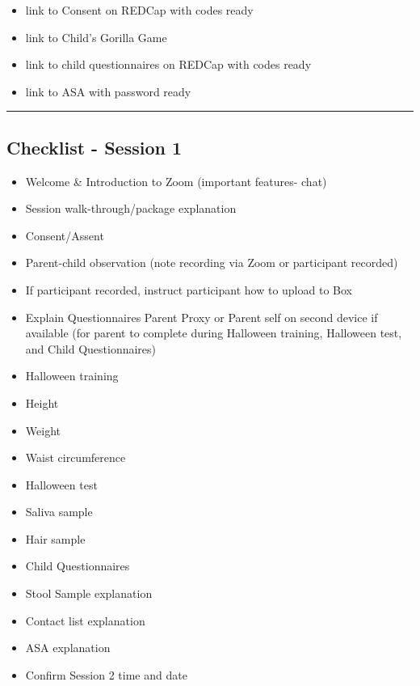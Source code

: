 \documentclass[]{book}
\providecommand{\tightlist}{%
  \setlength{\itemsep}{0pt}\setlength{\parskip}{0pt}}
\begin{document}
\begin{itemize}
  \begin{itemize}
  \tightlist
  \item
    link to Consent on REDCap with codes ready
  \item
    link to Child's Gorilla Game
  \item
    link to child questionnaires on REDCap with codes ready
  \item
    link to ASA with password ready
  \end{itemize}
\end{itemize}

\begin{center}\rule{0.5\linewidth}{0.5pt}\end{center}

\hypertarget{checklist---session-1-1}{%
\subsection{Checklist - Session 1}\label{checklist---session-1-1}}

\begin{itemize}
\tightlist
\item
  Welcome \& Introduction to Zoom (important features- chat)
\item
  Session walk-through/package explanation
\item
  Consent/Assent
\item
  Parent-child observation (note recording via Zoom or participant recorded)
\item
  If participant recorded, instruct participant how to upload to Box
\item
  Explain Questionnaires Parent Proxy or Parent self on second device if available (for parent to complete during Halloween training, Halloween test, and Child Questionnaires)
\item
  Halloween training
\item
  Height
\item
  Weight
\item
  Waist circumference
\item
  Halloween test
\item
  Saliva sample
\item
  Hair sample
\item
  Child Questionnaires
\item
  Stool Sample explanation
\item
  Contact list explanation
\item
  ASA explanation
\item
  Confirm Session 2 time and date
\end{itemize}
\end{document}
